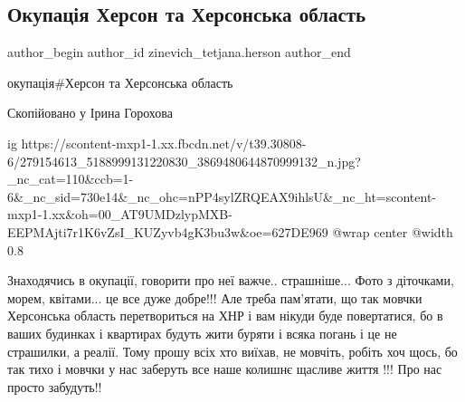  
 
 
 
 
 
\subsection{Окупація Херсон та Херсонська область}
\label{sec:06_05_2022.fb.zinevich_tetjana.herson.1.okupacia}
 
\ifcmt
 author_begin
   author_id zinevich_tetjana.herson
 author_end
\fi

окупація\#Херсон та Херсонська область

Скопійовано у Ірина Горохова 

\ifcmt
  ig https://scontent-mxp1-1.xx.fbcdn.net/v/t39.30808-6/279154613_5188999131220830_3869480644870999132_n.jpg?_nc_cat=110&ccb=1-6&_nc_sid=730e14&_nc_ohc=nPP4sylZRQEAX9ihlsU&_nc_ht=scontent-mxp1-1.xx&oh=00_AT9UMDzlypMXB-EEPMAjti7r1K6vZsI_KUZyvb4gK3bu3w&oe=627DE969
  @wrap center
  @width 0.8
\fi

Знаходячись в окупації, говорити про неї важче.. страшніше... Фото з діточками,
морем, квітами... це все дуже добре!!! Але треба пам'ятати, що так мовчки
Херсонська область перетвориться на ХНР і вам нікуди буде повертатися, бо в
ваших будинках і квартирах будуть жити буряти і всяка погань і це не страшилки,
а реалії. Тому прошу всіх хто виїхав, не мовчіть, робіть хоч щось, бо так тихо
і мовчки у нас заберуть все наше колишнє щасливе життя !!! Про нас просто
забудуть!!

